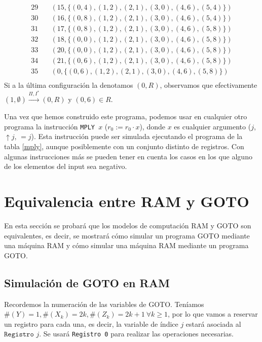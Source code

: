 \documentclass[twoside]{article}
\newcommand{\yields}{\overset{\Pi,I^*}{\rightarrow}}
\begin{document}
\begin{ej}
\begin{align*}
29\quad&(15,\{(0,4),(1,2),(2,1),(3,0),(4,6),(5,4)\})\\
30\quad&(16,\{(0,8),(1,2),(2,1),(3,0),(4,6),(5,4)\})\\
31\quad&(17,\{(0,8),(1,2),(2,1),(3,0),(4,6),(5,8)\})\\
32\quad&(18,\{(0,0),(1,2),(2,1),(3,0),(4,6),(5,8)\})\\
33\quad&(20,\{(0,0),(1,2),(2,1),(3,0),(4,6),(5,8)\})\\
34\quad&(21,\{(0,6),(1,2),(2,1),(3,0),(4,6),(5,8)\})\\
35\quad&(0,\{(0,6),(1,2),(2,1),(3,0),(4,6),(5,8)\})\\
\end{align*}
Si a la última configuración la denotamos $(0,R)$, observamos que efectivamente $(1,\emptyset)\yields (0,R)$ y $(0,6)\in R$. 
\end{ej}

\begin{nota}
Una vez que hemos construido este programa, podemos usar en cualquier otro programa la instrucción \texttt{MPLY }$x$ ($r_0:=r_0\cdot x$), donde $x$ es cualquier argumento ($j$, $\uparrow j$, $=j$). Esta instrucción puede ser simulada ejecutando el programa de la tabla \ref{mply}, aunque posiblemente con un conjunto distinto de registros. Con algunas instrucciones más se pueden tener en cuenta los casos en los que alguno de los elementos del input sea negativo. 
\end{nota}

\newpage

\section{Equivalencia entre RAM y GOTO}

En esta sección se probará que los modelos de computación RAM y GOTO son equivalentes, es decir, se mostrará cómo simular un programa GOTO mediante una máquina RAM  y cómo simular una máquina RAM mediante un programa GOTO. 

\subsection{Simulación de GOTO en RAM}
Recordemos la numeración de las variables de GOTO. Teníamos $\#(Y)=1,\#(X_k)=2k,\#(Z_k)=2k+1\ \forall k\geq 1$, por lo que vamos a reservar un registro para cada una, es decir, la variable de índice $j$ estará asociada al $\texttt{Registro } j$. Se usará \texttt{Registro 0} para realizar las operaciones necesarias.
\end{document}
